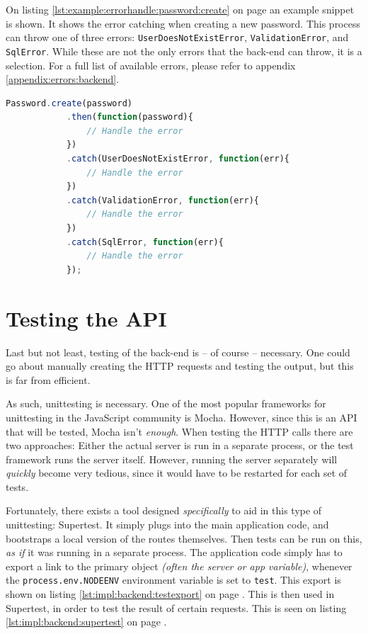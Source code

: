 		On listing \ref{lst:example:errorhandle:password:create} on page \pageref{lst:example:errorhandle:password:create} an example snippet is shown. It shows the error catching when creating a new password. This process can throw one of three errors: \verb=UserDoesNotExistError=, \verb=ValidationError=, and \verb=SqlError=. While these are not the only errors that the back-end can throw, it is a selection. For a full list of available errors, please refer to appendix \ref{appendix:errors:backend}.

		\begin{lstlisting}[language=Javascript,gobble=12,caption={Example of error handling, when creating new password},label={lst:example:errorhandle:password:create}]
            Password.create(password)
            .then(function(password){
                // Handle the error
            })
            .catch(UserDoesNotExistError, function(err){
                // Handle the error
            })
            .catch(ValidationError, function(err){
                // Handle the error
            })
            .catch(SqlError, function(err){
                // Handle the error
            });
		\end{lstlisting}

	\section{Testing the API}
		\label{sec:impl:tests}
		Last but not least, testing of the back-end is -- of course -- necessary. One could go about manually creating the HTTP requests and testing the output, but this is far from efficient.

		As such, unittesting is necessary. One of the most popular frameworks for unittesting in the JavaScript community is Mocha. However, since this is an API that will be tested, Mocha isn't \emph{enough}. When testing the HTTP calls there are two approaches: Either the actual server is run in a separate process, or the test framework runs the server itself. However, running the server separately will \emph{quickly} become very tedious, since it would have to be restarted for each set of tests. 

		Fortunately, there exists a tool designed \emph{specifically} to aid in this type of unittesting: Supertest. It simply plugs into the main application code, and bootstraps a local version of the routes themselves. Then tests can be run on this, \emph{as if} it was running in a separate process. The application code simply has to export a link to the primary object \emph{(often the server or app variable)}, whenever the \verb=process.env.NODEENV= environment variable is set to \verb=test=. This export is shown on listing \ref{lst:impl:backend:testexport} on page \pageref{lst:impl:backend:testexport}. This is then used in Supertest, in order to test the result of certain requests. This is seen on listing \ref{lst:impl:backend:supertest} on page \pageref{lst:impl:backend:supertest}. 

